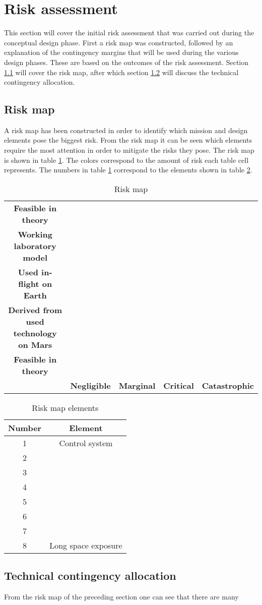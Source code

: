 \section{Risk assessment} 
\label{ch:risk}
This section will cover the initial risk assessment that was carried out during the conceptual design phase. First a risk map was constructed, followed by an explanation of the contingency margins that will be used during the various design phases. These are based on the outcomes of the risk assessment. Section \ref{sec:riskmap} will cover the risk map, after which section \ref{sec:tca} will discuss the technical contingency allocation.

\subsection{Risk map}
\label{sec:riskmap}
 A risk map has been constructed in order to identify which mission and design elements pose the biggest risk. From the risk map it can be seen which elements require the most attention in order to mitigate the risks they pose. The risk map is shown in table \ref{tab:riskmap}. The colors correspond to the amount of risk each table cell represents. The numbers in table \ref{tab:riskmap} correspond to the elements shown in table \ref{tab:riskelements}.

\begin{table}[h]
\centering
\caption{Risk map}
\label{tab:riskmap}
    \begin{tabular}{|c|c|c|c|c|}
    \hline
    \textbf{Feasible in theory} & & & & \\
    \textbf{Working laboratory model} & & & & \\
    \textbf{Used in-flight on Earth} & & & & \\
    \textbf{Derived from used technology on Mars} & & & & \\
    \textbf{Feasible in theory} & & & & \\
     & \textbf{Negligible} & \textbf{Marginal} & \textbf{Critical} & \textbf{Catastrophic} \\ \hline
    \end{tabular}
\end{table}

\begin{table}[h]
\centering
\caption{Risk map elements}
\label{tab:riskelements}
\begin{tabular}{|c|c|}
\hline
\textbf{Number} & \textbf{Element} \\
\hline
1 & Control system \\
2 & \\
3 & \\
4 & \\
5 & \\
6 & \\
7 & \\
8 & Long space exposure \\
\hline
\end{tabular}
\end{table}

\subsection{Technical contingency allocation}
\label{sec:tca}
From the risk map of the preceding section one can see that there are many
